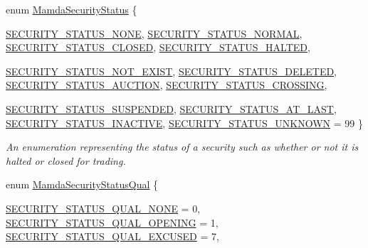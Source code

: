 \begin{CompactItemize}
enum \hyperlink{namespaceWombat_073e683b7aeffa26cf3d2791dda32b4b}{Mamda\-Security\-Status} \{ \par
\hyperlink{namespaceWombat_073e683b7aeffa26cf3d2791dda32b4b0769f003b770a9a28a51c347948d390f}{SECURITY\_\-STATUS\_\-NONE}, 
\hyperlink{namespaceWombat_073e683b7aeffa26cf3d2791dda32b4b7335e84b4585bd660c6b531d70bb2fc1}{SECURITY\_\-STATUS\_\-NORMAL}, 
\hyperlink{namespaceWombat_073e683b7aeffa26cf3d2791dda32b4b60a77eb01632c89172f1693a0a18ffb4}{SECURITY\_\-STATUS\_\-CLOSED}, 
\hyperlink{namespaceWombat_073e683b7aeffa26cf3d2791dda32b4be011caa165bc42be80239654981acb5b}{SECURITY\_\-STATUS\_\-HALTED}, 
\par
\hyperlink{namespaceWombat_073e683b7aeffa26cf3d2791dda32b4b968f866ea3983ac4433b4533a6a8dc84}{SECURITY\_\-STATUS\_\-NOT\_\-EXIST}, 
\hyperlink{namespaceWombat_073e683b7aeffa26cf3d2791dda32b4b9487aff982c0997934641e4c97fd895d}{SECURITY\_\-STATUS\_\-DELETED}, 
\hyperlink{namespaceWombat_073e683b7aeffa26cf3d2791dda32b4bb3bad99c26818274844ceb8cfa61d3f1}{SECURITY\_\-STATUS\_\-AUCTION}, 
\hyperlink{namespaceWombat_073e683b7aeffa26cf3d2791dda32b4b34284ab98d26e3255fc04e7591197a85}{SECURITY\_\-STATUS\_\-CROSSING}, 
\par
\hyperlink{namespaceWombat_073e683b7aeffa26cf3d2791dda32b4b20f36c5f104ca09b77d4d2710eb9b730}{SECURITY\_\-STATUS\_\-SUSPENDED}, 
\hyperlink{namespaceWombat_073e683b7aeffa26cf3d2791dda32b4bd99f9c3725c52e3eb3b123344a793bd2}{SECURITY\_\-STATUS\_\-AT\_\-LAST}, 
\hyperlink{namespaceWombat_073e683b7aeffa26cf3d2791dda32b4b46410152f0495b13771ec5e293859491}{SECURITY\_\-STATUS\_\-INACTIVE}, 
\hyperlink{namespaceWombat_073e683b7aeffa26cf3d2791dda32b4bf34caba9fab80f5778c6b988e4b551fb}{SECURITY\_\-STATUS\_\-UNKNOWN} =  99
 \}
\begin{CompactList}\small\item\em An enumeration representing the status of a security such as whether or not it is halted or closed for trading. \item\end{CompactList}\item 
enum \hyperlink{namespaceWombat_2de6f22c731ba94169dc24b8054862b8}{Mamda\-Security\-Status\-Qual} \{ \par
\hyperlink{namespaceWombat_2de6f22c731ba94169dc24b8054862b8d1355c2697c914a8bebdcf376f8fb86a}{SECURITY\_\-STATUS\_\-QUAL\_\-NONE} =  0, 
\hyperlink{namespaceWombat_2de6f22c731ba94169dc24b8054862b8457836fc3891c50955f8c03a1d875452}{SECURITY\_\-STATUS\_\-QUAL\_\-OPENING} =  1, 
\hyperlink{namespaceWombat_2de6f22c731ba94169dc24b8054862b8f923274eaf31de6f63e63d120b4af601}{SECURITY\_\-STATUS\_\-QUAL\_\-EXCUSED} =  7, 

\end{CompactItemize}
